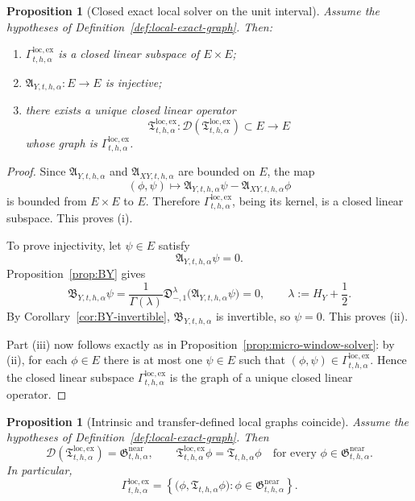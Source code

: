 \documentclass[11pt,a4paper]{amsart}
\theoremstyle{plain}
\newtheorem{proposition}[theorem]{Proposition}
\theoremstyle{definition}
\theoremstyle{remark}
\begin{document}
\begin{proposition}[Closed exact local solver on the unit interval]
\label{prop:local-exact-solver}
Assume the hypotheses of Definition~\ref{def:local-exact-graph}. Then:
\begin{enumerate}[label=(\roman*)]
\item \(\Gamma_{t,h,\alpha}^{\mathrm{loc,ex}}\) is a closed linear subspace of \(E\times E\);
\item \(\mathfrak A_{Y,t,h,\alpha}:E\to E\) is injective;
\item there exists a unique closed linear operator
\[
\mathfrak T_{t,h,\alpha}^{\mathrm{loc,ex}}:
\mathcal D(\mathfrak T_{t,h,\alpha}^{\mathrm{loc,ex}})\subset E\to E
\]
whose graph is \(\Gamma_{t,h,\alpha}^{\mathrm{loc,ex}}\).
\end{enumerate}
\end{proposition}

\begin{proof}
Since \(\mathfrak A_{Y,t,h,\alpha}\) and \(\mathfrak A_{XY,t,h,\alpha}\) are bounded on \(E\),
the map
\[
(\phi,\psi)\longmapsto
\mathfrak A_{Y,t,h,\alpha}\psi-\mathfrak A_{XY,t,h,\alpha}\phi
\]
is bounded from \(E\times E\) to \(E\). Therefore
\(\Gamma_{t,h,\alpha}^{\mathrm{loc,ex}}\), being its kernel, is a closed linear subspace. This
proves (i).

To prove injectivity, let \(\psi\in E\) satisfy
\[
\mathfrak A_{Y,t,h,\alpha}\psi=0.
\]
Proposition~\ref{prop:BY} gives
\[
\mathfrak B_{Y,t,h,\alpha}\psi
=
\frac{1}{\Gamma(\lambda)}
\mathfrak D_{-,1}^{\lambda}\bigl(\mathfrak A_{Y,t,h,\alpha}\psi\bigr)
=
0,
\qquad
\lambda:=H_Y+\frac12.
\]
By Corollary~\ref{cor:BY-invertible}, \(\mathfrak B_{Y,t,h,\alpha}\) is invertible, so
\(\psi=0\). This proves (ii).

Part (iii) now follows exactly as in Proposition~\ref{prop:micro-window-solver}: by (ii), for each
\(\phi\in E\) there is at most one \(\psi\in E\) such that \((\phi,\psi)\in
\Gamma_{t,h,\alpha}^{\mathrm{loc,ex}}\). Hence the closed linear subspace
\(\Gamma_{t,h,\alpha}^{\mathrm{loc,ex}}\) is the graph of a unique closed linear operator.
\end{proof}

\begin{proposition}[Intrinsic and transfer-defined local graphs coincide]
\label{prop:local-exact-identification}
Assume the hypotheses of Definition~\ref{def:local-exact-graph}. Then
\begin{equation}\label{eq:local-exact-identification}
\mathcal D(\mathfrak T_{t,h,\alpha}^{\mathrm{loc,ex}})
=
\mathfrak G_{t,h,\alpha}^{\mathrm{near}},
\qquad
\mathfrak T_{t,h,\alpha}^{\mathrm{loc,ex}}\phi
=
\mathfrak T_{t,h,\alpha}\phi
\quad
\text{for every }\phi\in\mathfrak G_{t,h,\alpha}^{\mathrm{near}}.
\end{equation}
In particular,
\[
\Gamma_{t,h,\alpha}^{\mathrm{loc,ex}}
=
\left\{
\bigl(\phi,\mathfrak T_{t,h,\alpha}\phi\bigr):
\phi\in\mathfrak G_{t,h,\alpha}^{\mathrm{near}}
\right\}.
\]
\end{proposition}
\end{document}

